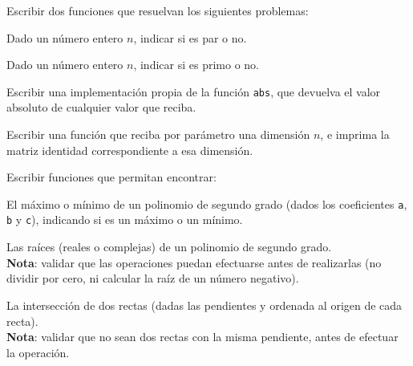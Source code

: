 \begin{ejercicio} Escribir dos funciones que resuelvan los siguientes problemas:
\begin{partes}
    \item Dado un número entero $n$, indicar si es par o no.
    \item Dado un número entero $n$, indicar si es primo o no.
\end{partes}
\end{ejercicio}

\begin{ejercicio}
Escribir una implementación propia de la función \verb!abs!,
que devuelva el valor absoluto de cualquier valor que reciba.
\end{ejercicio}

\begin{ejercicio}
Escribir una función que reciba por parámetro una dimensión $n$,
e imprima la matriz identidad correspondiente a esa dimensión.
\end{ejercicio}

\begin{ejercicio}
Escribir funciones que permitan encontrar:
\begin{partes}

    \item  El máximo o mínimo de un polinomio de segundo grado (dados los
coeficientes \verb!a!, \verb!b! y \verb!c!), indicando si es un máximo o un
mínimo.

    \item Las raíces (reales o complejas) de un polinomio de segundo grado. \\
{\bf Nota}: validar que las operaciones puedan efectuarse antes de
realizarlas (no dividir por cero, ni calcular la raíz de un número negativo).

    \item La intersección de dos rectas (dadas las pendientes y ordenada
 al origen de cada recta). \\
{\bf Nota}: validar que no sean dos rectas con la misma pendiente, antes de
efectuar la operación.
\end{partes}
\end{ejercicio}


